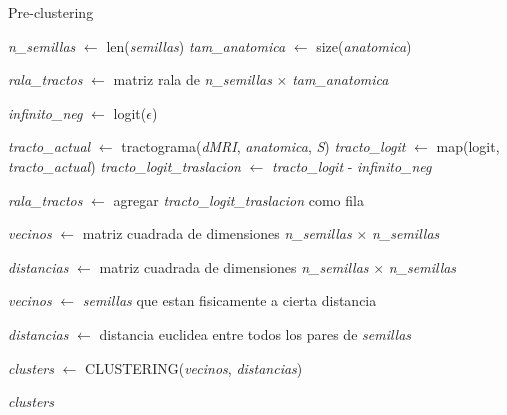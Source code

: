 \begin{algorithm}[h!]
\caption{Pre-clustering}\label{alg:preclustering}
\begin{algorithmic}[1]


\State \emph{n\_semillas} $\gets$ len(\emph{semillas})
\State \emph{tam\_anatomica} $\gets$ size(\emph{anatomica})

\State \emph{rala\_tractos} $\gets$ matriz rala de \emph{n\_semillas} $\times$ \emph{tam\_anatomica}

\State \emph{infinito\_neg} $\gets$ logit($\epsilon$)

    \State \emph{tracto\_actual} $\gets$ tractograma(\emph{dMRI}, \emph{anatomica}, \emph{S})
    \State \emph{tracto\_logit} $\gets$ map(logit, \emph{tracto\_actual})
    \State \emph{tracto\_logit\_traslacion} $\gets$ \emph{tracto\_logit} - \emph{infinito\_neg}
    
    \State \emph{rala\_tractos} $\gets$ agregar \emph{tracto\_logit\_traslacion} como fila 
\EndFor

\State \emph{vecinos} $\gets$ matriz cuadrada de dimensiones \emph{n\_semillas} $\times$
                                                             \emph{n\_semillas}

\State \emph{distancias} $\gets$ matriz cuadrada de dimensiones \emph{n\_semillas} $\times$
                                                             \emph{n\_semillas}

\State \emph{vecinos} $\gets$ \emph{semillas} que estan fisicamente a cierta distancia 
                                                             
\State \emph{distancias} $\gets$ distancia euclidea entre todos los pares de \emph{semillas}

\State \emph{clusters} $\gets$ CLUSTERING(\emph{vecinos}, \emph{distancias})

\State \Return \emph{clusters} 
 
\EndProcedure 

\end{algorithmic}
\end{algorithm}

